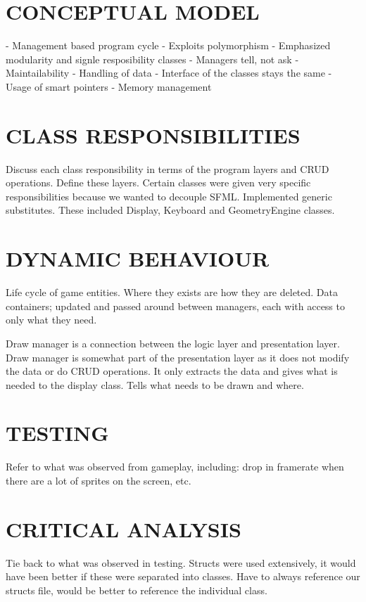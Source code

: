 \documentclass[10pt,twocolumn]{witseiepaper}
\begin{document}
%
\section{CONCEPTUAL MODEL}
- Management based program cycle
- Exploits polymorphism
- Emphasized modularity and signle resposibility classes
- Managers tell, not ask
- Maintailability
- Handling of data
- Interface of the classes stays the same
- Usage of smart pointers
- Memory management


%
\section{CLASS RESPONSIBILITIES}
Discuss each class responsibility in terms of the program layers and CRUD operations. Define these layers. Certain classes were given very specific responsibilities because we wanted to decouple SFML. Implemented generic substitutes. These included Display, Keyboard and GeometryEngine classes. 


%
\section{DYNAMIC BEHAVIOUR}
Life cycle of game entities. Where they exists are how they are deleted. Data containers; updated and passed around between managers, each with access to only what they need. 

Draw manager is a connection between the logic layer and presentation layer. Draw manager is somewhat part of the presentation layer as it does not modify the data or do CRUD operations. It only extracts the data and gives what is needed to the display class. Tells what needs to be drawn and where.


%
\section{TESTING}
Refer to what was observed from gameplay, including: drop in framerate when there are a lot of sprites on the screen, etc.


%
\section{CRITICAL ANALYSIS}
Tie back to what was observed in testing. Structs were used extensively, it would have been better if these were separated into classes. Have to always reference our structs file, would be better to reference the individual class. 
\end{document}

